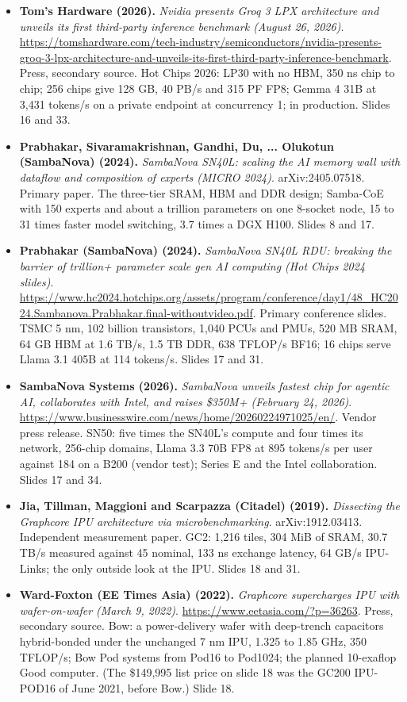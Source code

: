\documentclass[11pt,letterpaper]{article}
\begin{document}
\begin{itemize}[leftmargin=1.2em,itemsep=3pt]
\item \textbf{Tom's Hardware (2026).} \textit{Nvidia presents Groq 3 LPX architecture and unveils its first third-party inference benchmark (August 26, 2026)}. \url{https://tomshardware.com/tech-industry/semiconductors/nvidia-presents-groq-3-lpx-architecture-and-unveils-its-first-third-party-inference-benchmark}. Press, secondary source. Hot Chips 2026: LP30 with no HBM, 350 ns chip to chip; 256 chips give 128 GB, 40 PB/s and 315 PF FP8; Gemma 4 31B at 3,431 tokens/s on a private endpoint at concurrency 1; in production. Slides 16 and 33.
\item \textbf{Prabhakar, Sivaramakrishnan, Gandhi, Du, ... Olukotun (SambaNova) (2024).} \textit{SambaNova SN40L: scaling the AI memory wall with dataflow and composition of experts (MICRO 2024)}. arXiv:2405.07518. Primary paper. The three-tier SRAM, HBM and DDR design; Samba-CoE with 150 experts and about a trillion parameters on one 8-socket node, 15 to 31 times faster model switching, 3.7 times a DGX H100. Slides 8 and 17.
\item \textbf{Prabhakar (SambaNova) (2024).} \textit{SambaNova SN40L RDU: breaking the barrier of trillion+ parameter scale gen AI computing (Hot Chips 2024 slides)}. \url{https://www.hc2024.hotchips.org/assets/program/conference/day1/48_HC2024.Sambanova.Prabhakar.final-withoutvideo.pdf}. Primary conference slides. TSMC 5 nm, 102 billion transistors, 1,040 PCUs and PMUs, 520 MB SRAM, 64 GB HBM at 1.6 TB/s, 1.5 TB DDR, 638 TFLOP/s BF16; 16 chips serve Llama 3.1 405B at 114 tokens/s. Slides 17 and 31.
\item \textbf{SambaNova Systems (2026).} \textit{SambaNova unveils fastest chip for agentic AI, collaborates with Intel, and raises \$350M+ (February 24, 2026)}. \url{https://www.businesswire.com/news/home/20260224971025/en/}. Vendor press release. SN50: five times the SN40L's compute and four times its network, 256-chip domains, Llama 3.3 70B FP8 at 895 tokens/s per user against 184 on a B200 (vendor test); Series E and the Intel collaboration. Slides 17 and 34.
\item \textbf{Jia, Tillman, Maggioni and Scarpazza (Citadel) (2019).} \textit{Dissecting the Graphcore IPU architecture via microbenchmarking}. arXiv:1912.03413. Independent measurement paper. GC2: 1,216 tiles, 304 MiB of SRAM, 30.7 TB/s measured against 45 nominal, 133 ns exchange latency, 64 GB/s IPU-Links; the only outside look at the IPU. Slides 18 and 31.
\item \textbf{Ward-Foxton (EE Times Asia) (2022).} \textit{Graphcore supercharges IPU with wafer-on-wafer (March 9, 2022)}. \url{https://www.eetasia.com/?p=36263}. Press, secondary source. Bow: a power-delivery wafer with deep-trench capacitors hybrid-bonded under the unchanged 7 nm IPU, 1.325 to 1.85 GHz, 350 TFLOP/s; Bow Pod systems from Pod16 to Pod1024; the planned 10-exaflop Good computer. (The \$149,995 list price on slide 18 was the GC200 IPU-POD16 of June 2021, before Bow.) Slide 18.

\end{itemize}
\end{document}
